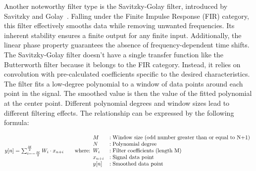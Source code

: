 Another noteworthy filter type is the Savitzky-Golay filter, introduced by Savitzky and Golay~\cite{savitzkySmoothingDifferentiationData1964}.
Falling under the Finite Impulse Response (FIR) category, this filter effectively smooths data while removing unwanted frequencies.
Its inherent stability ensures a finite output for any finite input.
Additionally, the linear phase property guarantees the absence of frequency-dependent time shifts.
The Savitzky-Golay filter doesn't have a single transfer function like the Butterworth filter because it belongs to the FIR category.
Instead, it relies on convolution with pre-calculated coefficients specific to the desired characteristics.
The filter fits a low-degree polynomial to a window of data points around each point in the signal.
The smoothed value is then the value of the fitted polynomial at the center point.
Different polynomial degrees and window sizes lead to different filtering effects.
The relationship can be expressed by the following formula:~
\Large
\begin{center}
    \begin{math}
        y[n] = \sum_{i=-\frac{M}{2}}^{\frac{M}{2}} W_i \cdot x_{n+i} \qquad
        \normalsize
        \text{where:} \\
        \normalsize
        \begin{array}{ll}
            M       & : \text{Window size (odd number greater than or equal to N+1)} \\
            N       & : \text{Polynomial degree}                                     \\
            W_i     & : \text{Filter coefficients (length M)}                        \\
            x_{n+i} & : \text{Signal data point}                                     \\
            y[n]    & : \text{Smoothed data point}
        \end{array}
    \end{math}
\end{center}
\normalsize

